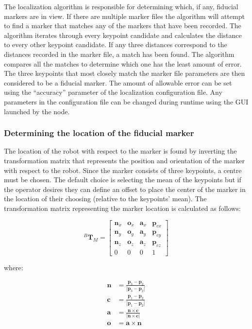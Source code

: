 The localization algorithm is responsible for determining which, if any, fiducial markers are in view. If there are multiple marker files the algorithm will attempt to find a marker that matches any of the markers that have been recorded. The algorithm iterates through every keypoint candidate and calculates the distance to every other keypoint candidate. If any three distances correspond to the distances recorded in the marker file, a match has been found. The algorithm compares all the matches to determine which one has the least amount of error. The three keypoints that most closely match the marker file parameters are then considered to be a fiducial marker. The amount of allowable error can be set using the ``accuracy'' parameter of the localization configuration file. Any parameters in the configuration file can be changed during runtime using the GUI launched by the  node.\\

\subsubsection{Determining the location of the fiducial marker}

The location of the robot with respect to the marker is found by inverting the transformation matrix that represents the position and orientation of the marker with respect to the robot. Since the marker consists of three keypoints, a centre must be chosen. The default choice is selecting the mean of the keypoints but if the operator desires they can define an offset to place the center of the marker in the location of their choosing (relative to the keypoints' mean). The transformation matrix representing the marker location is calculated as follows:

\begin{equation}
    ^{B}\mathbf{T}_{M} = \begin{bmatrix}
    \mathbf{n}_x & \mathbf{o}_x & \mathbf{a}_x & \mathbf{p}_{cx}\\
   \mathbf{n}_y & \mathbf{o}_y & \mathbf{a}_y & \mathbf{p}_{cy}\\
   \mathbf{n}_z & \mathbf{o}_z & \mathbf{a}_z & \mathbf{p}_{cz}\\
   0 & 0 & 0 & 1\end{bmatrix}\label{eq:1}
\end{equation}

\noindent where:

\begin{align}
    \mathbf{n} &= \frac{\mathbf{p}_3 - \mathbf{p}_2}{|\mathbf{p}_3 - \mathbf{p}_2|}\\
    \mathbf{c} &= \frac{\mathbf{p}_1 - \mathbf{p}_2}{|\mathbf{p}_1 - \mathbf{p}_2|}\\
    \mathbf{a} &= \frac{\mathbf{n}\times\mathbf{c}}{|\mathbf{n}\times\mathbf{c}|}\\
    \mathbf{o} &= \mathbf{a}\times\mathbf{n}
\end{align}

